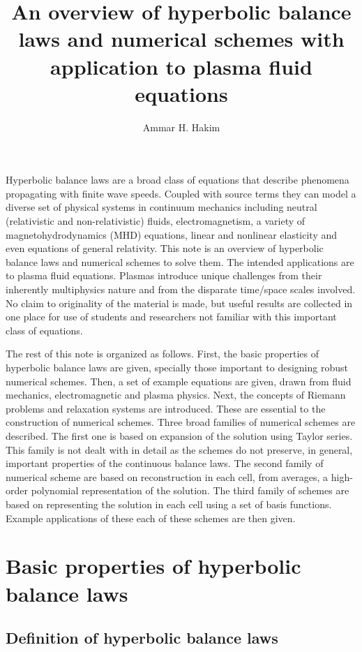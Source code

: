 \documentclass[11pt, reqno]{amsart}
\title[Hyperbolic balance laws]{An overview of hyperbolic balance laws
  and numerical schemes with application to plasma fluid equations}%
\author{Ammar H. Hakim}%
\date{}
\theoremstyle{definition}
\begin{document}
\maketitle

Hyperbolic balance laws are a broad class of equations that describe
phenomena propagating with finite wave speeds. Coupled with source
terms they can model a diverse set of physical systems in continuum
mechanics including neutral (relativistic and non-relativistic) fluids,
electromagnetism, a variety of magnetohydrodynamics (MHD) equations,
linear and nonlinear elasticity and even equations of general
relativity. This note is an overview of hyperbolic balance laws and
numerical schemes to solve them. The intended applications are to
plasma fluid equations. Plasmas introduce unique challenges from their
inherently multiphysics nature and from the disparate time/space
scales involved. No claim to originality of the material is made, but
useful results are collected in one place for use of students and
researchers not familiar with this important class of equations.

The rest of this note is organized as follows. First, the basic
properties of hyperbolic balance laws are given, specially those
important to designing robust numerical schemes. Then, a set of
example equations are given, drawn from fluid mechanics,
electromagnetic and plasma physics. Next, the concepts of Riemann
problems and relaxation systems are introduced. These are essential to
the construction of numerical schemes. Three broad families of
numerical schemes are described. The first one is based on expansion
of the solution using Taylor series. This family is not dealt with in
detail as the schemes do not preserve, in general, important
properties of the continuous balance laws. The second family of
numerical scheme are based on reconstruction in each cell, from
averages, a high-order polynomial representation of the solution. The
third family of schemes are based on representing the solution in each
cell using a set of basis functions. Example applications of these
each of these schemes are then given.

\section{Basic properties of hyperbolic balance laws}

\subsection{Definition of hyperbolic balance laws}
\end{document}
